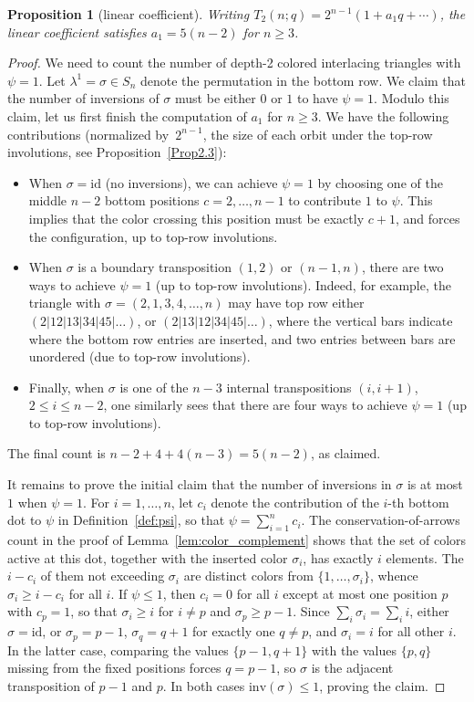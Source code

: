 \documentclass[pdftex]{sigma}
\numberwithin{equation}{section}
\newtheorem{Proposition}[Theorem]{Proposition}
\theoremstyle{definition}
\begin{document}
\begin{Proposition}[linear coefficient]\label{prop:linear_coefficient} Writing
	$T_2(n;q) = 2^{n-1}(1 + a_1 q + \cdots)$, the linear coefficient satisfies
	$a_1 = 5(n-2)$ for $n \ge 3$.
\end{Proposition}
\begin{proof}
	We need to count the number of depth-2 colored interlacing triangles with
	$\psi = 1$.
	Let $\lambda^1=\sigma\in S_n$ denote the permutation in the bottom row.
	We claim that the number of inversions of $\sigma$ must be either $0$ or $1$
	to have $\psi = 1$.
	Modulo this claim, let us first finish the computation of $a_1$ for $n\ge3$.
	We have the following contributions (normalized by~$2^{n-1}$, the size of each orbit under the
top-row involutions, see Proposition~\ref{Prop2.3}):{\samepage
	\begin{itemize}\itemsep=0pt
		\item
		When $\sigma=\mathrm{id}$ (no inversions), we can achieve $\psi=1$ by
		choosing one of the middle $n-2$ bottom positions $c=2,\dots,n-1$ to
		contribute $1$ to $\psi$.
		This implies that the color crossing this position must be exactly
		$c+1$, and forces the configuration, up to top-row involutions.
		\item
		When $\sigma$ is a boundary transposition $(1,2)$ or $(n-1,n)$, there
		are two ways to achieve $\psi=1$ (up to top-row involutions).
		Indeed, for example, the triangle with $\sigma=(2,1,3,4,\dots,n) $ may
		have top row either $(2| 12| 13| 34| 45| \dots) $, or
		$(2| 13| 12| 34| 45| \dots) $, where the vertical bars indicate where
		the bottom row entries are inserted, and two entries between bars are
		unordered (due to top-row involutions).
		\item
		Finally, when $\sigma$ is one of the $n-3$ internal transpositions
		$(i,i+1)$, $2\le i \le n-2$, one similarly sees that there are four ways
		to achieve $\psi=1$ (up to top-row involutions).
	\end{itemize}
	The final count is $n-2+4+4(n-3)=5(n-2)$, as claimed.}

	It remains to prove the initial claim that the number of inversions in
	$\sigma$ is at most $1$ when $\psi=1$.
	For $i=1,\dots,n $, let $c_i$ denote the contribution of the $i$-th
	bottom dot to $\psi$ in Definition~\ref{def:psi}, so that $\psi=\sum_{i=1}^{n}c_i$.
	The conservation-of-arrows count in the proof of
	Lemma~\ref{lem:color_complement} shows that the set of colors active at this
	dot, together with the inserted color $\sigma_i$, has exactly $i$
	elements.
	The $i-c_i$ of them not exceeding $\sigma_i$ are distinct colors from
	$\{1,\dots,\sigma_i\}$, whence $\sigma_i \ge i-c_i$ for all $i$.
	If $\psi\le1$, then $c_i=0$ for all $i$ except at most one position $p$
	with $c_p=1$, so that $\sigma_i\ge i$ for $i\ne p$ and
	$\sigma_p\ge p-1$.
	Since $\sum_{i}\sigma_i=\sum_{i}i$, either $\sigma=\mathrm{id}$, or
	$\sigma_p=p-1$, $\sigma_q=q+1$ for exactly one $q\ne p$, and
	$\sigma_i=i$ for all other $i$.
	In the latter case, comparing the values $\{p-1,q+1\}$ with the values
	$\{p,q\}$ missing from the fixed positions forces $q=p-1$, so $\sigma$
	is the adjacent transposition of $p-1$ and $p$.
	In both cases $\mathrm{inv}(\sigma)\le1$, proving the claim.


\end{proof}
\end{document}
